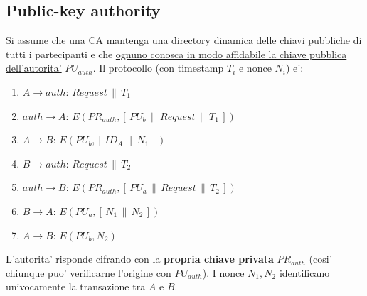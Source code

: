 \subsection{Public-key authority}
Si assume che una CA mantenga una directory dinamica delle chiavi pubbliche di tutti i partecipanti e che \underline{ognuno conosca in modo affidabile la chiave pubblica dell'autorita'} $ PU_{auth} $. Il protocollo (con timestamp $ T_i $ e nonce $ N_i $) e':
\begin{enumerate}
  \item $ A \to auth $: \quad $ Request \,\|\, T_1 $
  \item $ auth \to A $: \quad $ E(PR_{auth}, [\, PU_b \,\|\, Request \,\|\, T_1 \,]) $
  \item $ A \to B $: \quad $ E(PU_b, [\, ID_A \,\|\, N_1 \,]) $
  \item $ B \to auth $: \quad $ Request \,\|\, T_2 $
  \item $ auth \to B $: \quad $ E(PR_{auth}, [\, PU_a \,\|\, Request \,\|\, T_2 \,]) $
  \item $ B \to A $: \quad $ E(PU_a, [\, N_1 \,\|\, N_2 \,]) $
  \item $ A \to B $: \quad $ E(PU_b, N_2) $
\end{enumerate}
L'autorita' risponde cifrando con la \textbf{propria chiave privata} $ PR_{auth} $ (cosi' chiunque puo' verificarne l'origine con $ PU_{auth} $). I nonce $ N_1, N_2 $ identificano univocamente la transazione tra $ A $ e $ B $.

